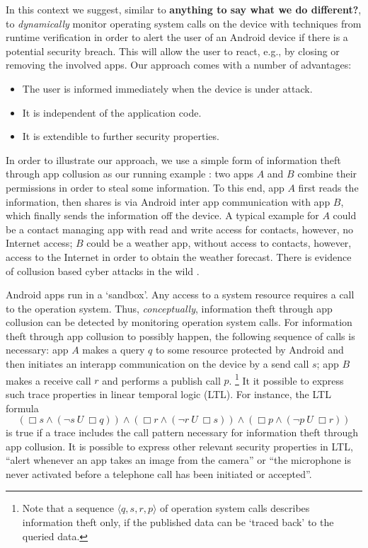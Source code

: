 \documentclass[runningheads]{llncs}
\begin{document}
In this context we suggest, similar to \cite{bauer2012runtime} {\bf
  anything to say what we do different?}, to \emph{dynamically}
monitor operating system calls on the device with techniques from
runtime verification in order to alert the user of an Android device
if there is a potential security breach. This will allow the user to
react, e.g., by closing or removing the involved apps. Our approach
comes with a number of advantages:
\begin{itemize}
\item The user is informed immediately when the device is under
  attack.
\item It is independent of the application code.  %
\item It is extendible to further security properties.
\end{itemize}

In order to illustrate our approach, we use a simple form of
information theft through app collusion as our running example
\cite{collusion17}: two apps $A$ and $B$ combine their permissions in
order to steal some information. To this end, app $A$ first reads the
information, then shares is via Android inter app communication with
app $B$, which finally sends the information off the device. A typical
example for $A$ could be a contact managing app with read and write
access for contacts, however, no Internet access; $B$ could be a
weather app, without access to contacts, however, access to the
Internet in order to obtain the weather forecast. There is evidence of
collusion based cyber attacks in the wild
\cite{PrologAppCollusion}. 

Android apps run in a `sandbox'. Any access to a system resource
requires a call to the operation system. Thus, \emph{conceptually},
information theft through app collusion can be detected by monitoring
operation system calls. For information theft through app collusion to
possibly happen, the following sequence of calls is necessary: app $A$
makes a query $q$ to some resource protected by Android and then
initiates an interapp communication on the device by a send call $s$;
app $B$ makes a receive call $r$ and performs a publish call
$p$. \footnote{Note that a sequence $\langle q, s, r, p \rangle$ of
  operation system calls describes information theft only, if the
  published data can be `traced back' to the queried data.} It it
possible to express such trace properties in linear temporal logic
(LTL). For instance, the LTL formula
%
$$       (\Box s \land (\neg s\ U\ \Box q))
   \land (\Box r \land (\neg r\ U\ \Box s)) 
   \land (\Box p \land (\neg p\ U\ \Box r)) 
$$ 
%
is true if a trace includes the call pattern necessary for information
theft through app collusion.
%
It is possible to express other relevant security properties in LTL,
``alert whenever an app takes an image from the camera'' or ``the
microphone is never activated before a telephone call has been
initiated or accepted''.
\end{document}
